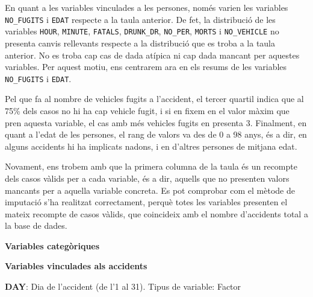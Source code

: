 \documentclass[11pt,longbibliography]{article}
\theoremstyle{definition}
\theoremstyle{remark}
\begin{document}
En quant a les variables vinculades a les persones, només varien les variables \texttt{NO\_FUGITS} i \texttt{EDAT} respecte a la taula anterior. De fet, la distribució de les variables \texttt{HOUR}, \texttt{MINUTE}, \texttt{FATALS}, \texttt{DRUNK\_DR}, \texttt{NO\_PER}, \texttt{MORTS} i \texttt{NO\_VEHICLE} no presenta canvis rellevants respecte a la distribució que es troba a la taula anterior. No es troba cap cas de dada atípica ni cap dada mancant per aquestes variables. Per aquest motiu, ens centrarem ara en els resums de les variables \texttt{NO\_FUGITS} i \texttt{EDAT}.


Pel que fa al nombre de vehicles fugits a l'accident, el tercer quartil indica que al 75\% dels casos no hi ha cap vehicle fugit, i si en fixem en el valor màxim que pren aquesta variable, el cas amb més vehicles fugits en presenta 3. Finalment, en quant a l'edat de les persones, el rang de valors va des de 0 a 98 anys, és a dir, en alguns accidents hi ha implicats nadons, i en d'altres persones de mitjana edat. 

Novament, ens trobem amb que la primera columna de la taula és un recompte dels casos vàlids per a cada variable, és a dir, aquells que no presenten valors mancants per a aquella variable concreta. Es pot comprobar com el mètode de imputació s'ha realitzat correctament, perquè totes les variables presenten el mateix recompte de casos vàlids, que coincideix amb el nombre d'accidents total a la base de dades.



\begin{large}

\textbf{Variables categòriques}

\end{large}

\textbf{Variables vinculades als accidents}



\textbf{DAY}: Dia de l’accident (de l’1 al 31). Tipus de variable: Factor
\end{document}
